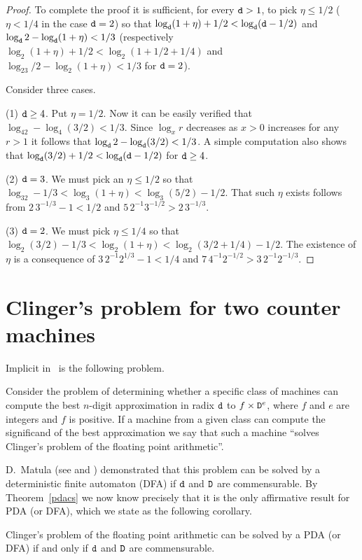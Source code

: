 \documentclass[12pt]{article}
\begin{document}
\begin{proof}
To complete the proof it is sufficient, for every ${\tt d}>1$, to pick
$\eta\leq1/2$ ($\eta<1/4$ in the case ${\tt d}=2$) so that 
$\log_{\tt d}(1+\eta)+1/2<\log_{\tt d}({\tt d}-1/2)$ and $\log_{\tt d}2-\log_{\tt d}(1+\eta)<1/3$
(respectively $\log_2(1+\eta)+1/2<\log_2(1+1/2+1/4)$ and
$\log_23/2-\log_2(1+\eta)<1/3$ for ${\tt d}=2$).

Consider three cases.

(1) ${\tt d}\geq4$. Put $\eta=1/2$. Now it can be easily
verified that $\log_42-\log_4(3/2)<1/3$. Since $\log_xr$ decreases as
$x>0$ increases for any $r>1$ it follows that
$\log_{\tt d}2-\log_{\tt d}(3/2)<1/3$. A simple computation also shows that 
$\log_{\tt d}(3/2)+1/2<\log_{\tt d}({\tt d}-1/2)$ for ${\tt d}\geq4$.

(2) ${\tt d}=3$. We must pick an $\eta\leq1/2$ so that 
$\log_32-1/3<\log_3(1+\eta)<\log_3(5/2)-1/2$. That such $\eta$ exists
follows from $2\,3^{-1/3}-1<1/2$ and $5\,2^{-1}3^{-1/2}>2\,3^{-1/3}$.

(3) ${\tt d}=2$. We must pick $\eta\leq1/4$ so that
$\log_2(3/2)-1/3<\log_2(1+\eta)<\log_2(3/2+1/4)-1/2$. The existence of
$\eta$ is a consequence of $3\,2^{-1}2^{1/3}-1<1/4$ and
$7\,4^{-1}2^{-1/2}>3\,2^{-1}2^{-1/3}$.
\end{proof}

\section{Clinger's problem for two counter machines}

Implicit in~\cite{Clinger} is the following problem.
\begin{definition}
Consider the problem of determining whether a
specific class of machines can compute the best $n$-digit
approximation in radix ${\tt d}$ to $f\times{\tt D}^e$,
where $f$ and $e$ are integers and $f$ is positive. If a machine from a given class can
compute the significand of the best approximation we say that such a machine
``solves Clinger's problem of the floating point arithmetic''.
\end{definition}

D.~Matula (see \cite{Matulainout} and \cite{Clinger})
demonstrated that this problem can be solved by a deterministic finite
automaton (DFA) if ${\tt d}$ and ${\tt D}$ are commensurable.
By Theorem~\ref{pdacs} we now know precisely that it is the only affirmative result
for PDA (or DFA), which we state as the following corollary.
\begin{corollary}
Clinger's problem of the floating point arithmetic can be solved by a PDA
(or DFA) if and only if ${\tt d}$ and ${\tt D}$ are commensurable.
\end{corollary}
\end{document}
